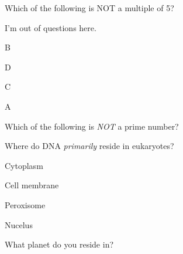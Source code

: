 \documentclass[12pt]{exam}
\begin{document}
\begin{questions}
    \question Which of the following is NOT a multiple of 5?
    
        \begin{oneparchoices}
        
        
        
        
        
        \end{oneparchoices}

    \question I'm out of questions here.
    
        \begin{oneparchoices}
        
            \choice B
        
            \choice D
        
            \choice C
        
            \choice A
        
        \end{oneparchoices}

    \question Which of the following is \textit{NOT} a prime number?
    
        \begin{oneparchoices}
        
        
        
        
        
        \end{oneparchoices}

    \question Where do DNA \textit{primarily} reside in eukaryotes?
    
        \begin{oneparchoices}
        
            \choice Cytoplasm
        
            \choice Cell membrane
        
            \choice Peroxisome
        
            \choice Nucelus
        
        \end{oneparchoices}

    \question What planet do you reside in?
    
        \begin{oneparchoices}
        

\end{oneparchoices}
\end{questions}
\end{document}
